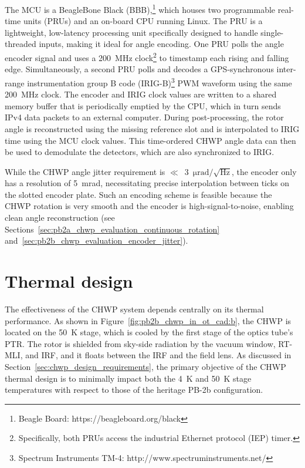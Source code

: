 The MCU is a BeagleBone Black (BBB),\footnote{Beagle Board: https://beagleboard.org/black} which houses two programmable real-time units (PRUs) and an on-board CPU running Linux. The PRU is a lightweight, low-latency processing unit specifically designed to handle single-threaded inputs, making it ideal for angle encoding. One PRU polls the angle encoder signal and uses a 200~MHz clock\footnote{Specifically, both PRUs access the industrial Ethernet protocol (IEP) timer.} to timestamp each rising and falling edge. Simultaneously, a second PRU polls and decodes a GPS-synchronous inter-range instrumentation group B code (IRIG-B)\footnote{Spectrum Instruments TM-4: http://www.spectruminstruments.net/} PWM waveform using the same 200~MHz clock. The encoder and IRIG clock values are written to a shared memory buffer that is periodically emptied by the CPU, which in turn sends IPv4 data packets to an external computer. During post-processing, the rotor angle is reconstructed using the missing reference slot and is interpolated to IRIG time using the MCU clock values. This time-ordered CHWP angle data can then be used to demodulate the detectors, which are also synchronized to IRIG.

While the CHWP angle jitter requirement is $\ll$~$3$~$\mathrm{\mu rad / \sqrt{Hz}}$, the encoder only has a resolution of 5~mrad, necessitating precise interpolation between ticks on the slotted encoder plate. Such an encoding scheme is feasible because the CHWP rotation is very smooth and the encoder is high-signal-to-noise, enabling clean angle reconstruction (see Sections~\ref{sec:pb2a_chwp_evaluation_continuous_rotation} and~\ref{sec:pb2b_chwp_evaluation_encoder_jitter}).


\section{Thermal design}
\label{sec:thermal_design}

The effectiveness of the CHWP system depends centrally on its thermal performance. As shown in Figure~\ref{fig:pb2b_chwp_in_ot_cad:b}, the CHWP is located on the 50~K stage, which is cooled by the first stage of the optics tube's PTR. The rotor is shielded from sky-side radiation by the vacuum window, RT-MLI, and IRF, and it floats between the IRF and the field lens. As discussed in Section~\ref{sec:chwp_design_requirements}, the primary objective of the CHWP thermal design is to minimally impact both the 4~K and 50~K stage temperatures with respect to those of the heritage PB-2b configuration.

